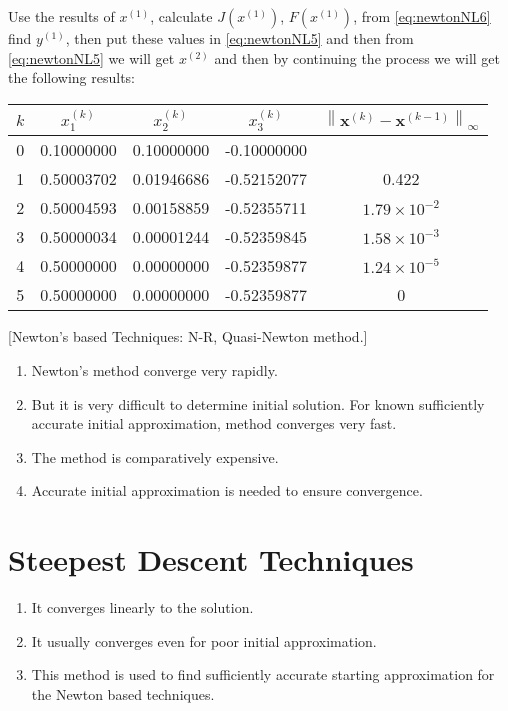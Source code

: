 \documentclass[../main-sheet.tex]{subfiles}
\begin{document}
\begin{ex}
\begin{note}
\begin{equation}
        \label{eq:newtonNL6}
        \end{equation}
        Use the results of \(x^{(1)}\), calculate \(J(x^{(1)})\), \(F\left( x^{(1)} \right)\), from \eqref{eq:newtonNL6} find \(y^{(1)}\), then put these values in \eqref{eq:newtonNL5} and then from \eqref{eq:newtonNL5} we will get \(x^{(2)}\) and then by continuing the process we will get the following results:
    \end{note}
    \begin{table}[H]
        \centering
        \begin{tabular}{clllc}
            \toprule
            \(k\) & \multicolumn{1}{c}{\(x_1^{(k)}\)} & \multicolumn{1}{c}{\(x_2^{(k)}\)} & \multicolumn{1}{c}{\(x_3^{(k)}\)} & \(\left\|\mathbf{x}^{(k)}-\mathbf{x}^{(k-1)}\right\|_\infty\)\\\midrule
            0 & 0.10000000 & 0.10000000 & -0.10000000 & \\
            1 & 0.50003702 & 0.01946686 & -0.52152077 & 0.422 \\
            2 & 0.50004593 & 0.00158859 & -0.52355711 & \(1.79\times 10^{-2}\) \\
            3 & 0.50000034 & 0.00001244 & -0.52359845 & \(1.58\times 10^{-3}\) \\
            4 & 0.50000000 & 0.00000000 & -0.52359877 & \(1.24\times 10^{-5}\) \\
            5 & 0.50000000 & 0.00000000 & -0.52359877 & 0 \\
            \bottomrule
        \end{tabular}
    \end{table}
\end{ex}
[Newton's based Techniques: N-R, Quasi-Newton method.]\\
\begin{note}\hfill
    \begin{enumerate}
        \item Newton's method converge very rapidly.
        \item But it is very difficult to determine initial solution. For known sufficiently accurate initial approximation, method converges very fast.
        \item The method is comparatively expensive.
        \item Accurate initial approximation is needed to ensure convergence.
    \end{enumerate}
\end{note}
\section{Steepest Descent Techniques}
\begin{enumerate}
    \item It converges linearly to the solution.
    \item It usually converges even for poor initial approximation.
    \item This method is used to find sufficiently accurate starting approximation for the Newton based techniques.
\end{enumerate}
\end{document}
